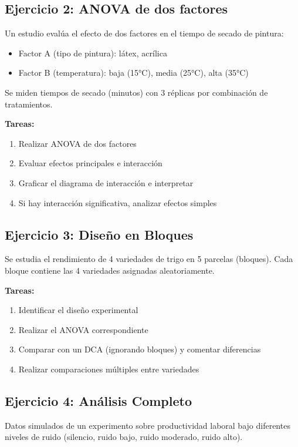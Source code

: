 \documentclass[11pt,a4paper]{article}
\theoremstyle{definition}
\begin{document}
\subsection{Ejercicio 2: ANOVA de dos factores}

Un estudio evalúa el efecto de dos factores en el tiempo de secado de pintura:
\begin{itemize}
    \item Factor A (tipo de pintura): látex, acrílica
    \item Factor B (temperatura): baja (15°C), media (25°C), alta (35°C)
\end{itemize}

Se miden tiempos de secado (minutos) con 3 réplicas por combinación de tratamientos.

\textbf{Tareas:}
\begin{enumerate}
    \item Realizar ANOVA de dos factores
    \item Evaluar efectos principales e interacción
    \item Graficar el diagrama de interacción e interpretar
    \item Si hay interacción significativa, analizar efectos simples
\end{enumerate}

\subsection{Ejercicio 3: Diseño en Bloques}

Se estudia el rendimiento de 4 variedades de trigo en 5 parcelas (bloques). Cada bloque contiene las 4 variedades asignadas aleatoriamente.

\textbf{Tareas:}
\begin{enumerate}
    \item Identificar el diseño experimental
    \item Realizar el ANOVA correspondiente
    \item Comparar con un DCA (ignorando bloques) y comentar diferencias
    \item Realizar comparaciones múltiples entre variedades
\end{enumerate}

\subsection{Ejercicio 4: Análisis Completo}

Datos simulados de un experimento sobre productividad laboral bajo diferentes niveles de ruido (silencio, ruido bajo, ruido moderado, ruido alto).
\end{document}
